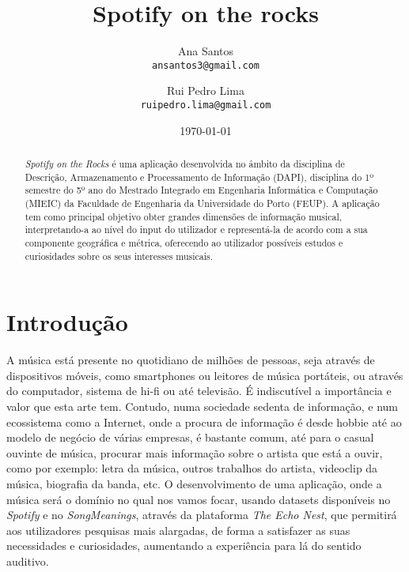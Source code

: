 \documentclass[twocolumn,twoside,11pt,a4paper]{article}
\title{\vspace{-15mm}\fontsize{24pt}{10pt}\selectfont\textbf{Spotify on the rocks}}
\author{Ana Santos\\
\small \texttt{ansantos3@gmail.com}\\
\and
Rui Pedro Lima\\
\small \texttt{ruipedro.lima@gmail.com}
\vspace{-5mm}
}
\date{\today}
\begin{document}
\maketitle
\thispagestyle{plain}            %


\begin{abstract}


\textit{Spotify on the Rocks} é uma aplicação desenvolvida no âmbito da disciplina de
Descrição, Armazenamento e Processamento de Informação (DAPI), disciplina do 1º
semestre do 5º ano do Mestrado Integrado em Engenharia Informática e Computação
(MIEIC) da Faculdade de Engenharia da Universidade do Porto (FEUP).
A aplicação tem como principal objetivo obter grandes dimensões de informação
musical, interpretando-a ao nível do input do utilizador e representá-la de acordo com
a sua componente geográfica e métrica, oferecendo ao utilizador possíveis estudos e
curiosidades sobre os seus interesses musicais.

\end{abstract}


\section{Introdução}\label{sec:intro}


A música está presente no quotidiano de milhões de pessoas, seja através de
dispositivos móveis, como smartphones ou leitores de música portáteis, ou através do
computador, sistema de hi-fi ou até televisão. É indiscutível a importância e valor
que esta arte tem.
Contudo, numa sociedade sedenta de informação, e num ecossistema como a Internet, onde
a procura de informação é desde hobbie até ao modelo de negócio de várias empresas,
é bastante comum, até para o casual ouvinte de música, procurar mais informação
sobre o artista que está a ouvir, como por exemplo: letra da música, outros trabalhos
do artista, videoclip da música, biografia da banda, etc.
O desenvolvimento de uma aplicação, onde a música será o domínio no qual nos vamos
focar, usando datasets disponíveis no \textit{Spotify} e no \textit{SongMeanings},
através da plataforma \textit{The Echo Nest}, que permitirá aos utilizadores pesquisas
mais alargadas, de forma a satisfazer as suas necessidades e curiosidades, aumentando a
experiência para lá do sentido auditivo.
\end{document}
